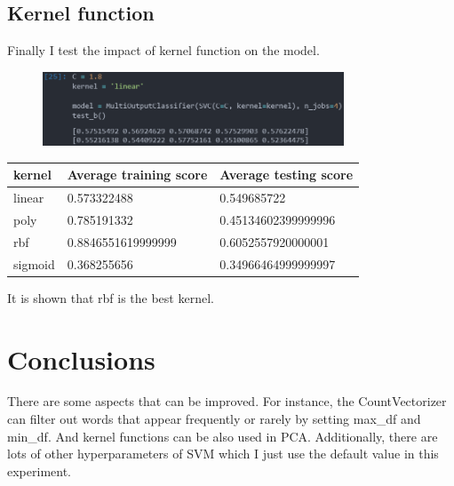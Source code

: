 \documentclass[UTF8, a4paper, 11pt]{article}
\begin{document}
\subsection{Kernel function}
Finally I test the impact of kernel function on the model.
\begin{figure}[H]
    \centering
    \includegraphics[width=0.8\textwidth]{kernel.png}
\end{figure}
\begin{table}[H]
    \center
\begin{tabular}{|l|l|l|}
\hline
kernel  & Average training score & Average testing score \\ \hline
linear  & 0.573322488            & 0.549685722           \\ \hline
poly    & 0.785191332            & 0.45134602399999996   \\ \hline
rbf     & 0.8846551619999999     & 0.6052557920000001    \\ \hline
sigmoid & 0.368255656            & 0.34966464999999997   \\ \hline
\end{tabular}
\end{table}
It is shown that rbf is the best kernel.
\section{Conclusions}
There are some aspects that can be improved.
For instance, the CountVectorizer can filter out words that appear frequently or rarely by setting max\_df and min\_df.
And kernel functions can be also used in PCA.
Additionally, there are lots of other hyperparameters of SVM which I just use the default value in this experiment.
%
%
\end{document}
